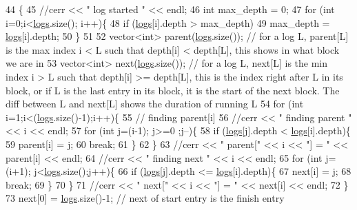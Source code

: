 \begin{DoxyCode}
44                 \{
45   \textcolor{comment}{//cerr << " log started " << endl;}
46   \textcolor{keywordtype}{int} max\_depth = 0;
47   \textcolor{keywordflow}{for} (\textcolor{keywordtype}{int} i=0;i<\hyperlink{classlogger_a46e89697a97bc41a90ec78763bfe4d39}{logs}.size(); i++)\{
48     \textcolor{keywordflow}{if} (\hyperlink{classlogger_a46e89697a97bc41a90ec78763bfe4d39}{logs}[i].depth > max\_depth)
49       max\_depth = \hyperlink{classlogger_a46e89697a97bc41a90ec78763bfe4d39}{logs}[i].depth;
50   \}
51 
52   vector<int> parent(\hyperlink{classlogger_a46e89697a97bc41a90ec78763bfe4d39}{logs}.size()); \textcolor{comment}{// for a log L, parent[L] is the max index i < L such that depth[i]
       < depth[L], this shows in what block we are in}
53   vector<int> next(\hyperlink{classlogger_a46e89697a97bc41a90ec78763bfe4d39}{logs}.size()); \textcolor{comment}{// for a log L, next[L] is the min index i > L such that depth[i] >=
       depth[L], this is the index right after L in its block, or if L is the last entry in its block, it is the
       start of the next block. The diff between L and next[L] shows the duration of running L}
54   \textcolor{keywordflow}{for} (\textcolor{keywordtype}{int} i=1;i<(\hyperlink{classlogger_a46e89697a97bc41a90ec78763bfe4d39}{logs}.size()-1);i++)\{
55     \textcolor{comment}{// finding parent[i]}
56     \textcolor{comment}{//cerr << " finding parent " << i << endl;}
57     \textcolor{keywordflow}{for} (\textcolor{keywordtype}{int} j=(i-1); j>=0 ;j--)\{
58       \textcolor{keywordflow}{if} (\hyperlink{classlogger_a46e89697a97bc41a90ec78763bfe4d39}{logs}[j].depth < \hyperlink{classlogger_a46e89697a97bc41a90ec78763bfe4d39}{logs}[i].depth)\{
59         parent[i] = j;
60         \textcolor{keywordflow}{break};
61       \}
62     \}
63     \textcolor{comment}{//cerr << " parent[" << i << "] = " << parent[i] << endl;}
64     \textcolor{comment}{//cerr << " finding next " << i << endl;}
65     \textcolor{keywordflow}{for} (\textcolor{keywordtype}{int} j=(i+1); j<\hyperlink{classlogger_a46e89697a97bc41a90ec78763bfe4d39}{logs}.size();j++)\{
66       \textcolor{keywordflow}{if} (\hyperlink{classlogger_a46e89697a97bc41a90ec78763bfe4d39}{logs}[j].depth <= \hyperlink{classlogger_a46e89697a97bc41a90ec78763bfe4d39}{logs}[i].depth)\{
67         next[i] = j;
68         \textcolor{keywordflow}{break};
69       \}
70     \}
71     \textcolor{comment}{//cerr << " next[" << i << "] = " << next[i] << endl;}
72   \}
73   next[0] = \hyperlink{classlogger_a46e89697a97bc41a90ec78763bfe4d39}{logs}.size()-1; \textcolor{comment}{// next of start entry is the finish entry}

\end{DoxyCode}
